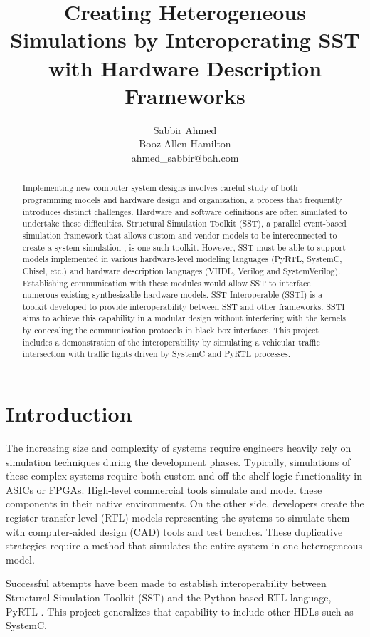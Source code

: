 \documentclass{article}
\title{Creating Heterogeneous Simulations by Interoperating SST with Hardware Description Frameworks}
\author{
  Sabbir Ahmed \\
  Booz Allen Hamilton \\
  ahmed\_sabbir@bah.com
}
\begin{document}
  \maketitle

  \begin{abstract}
    Implementing new computer system designs involves careful study of both programming models and
    hardware design and organization, a process that frequently introduces distinct challenges.
    Hardware and software definitions are often simulated to undertake these difficulties.
    Structural Simulation Toolkit (SST), a parallel event-based simulation framework that allows
    custom and vendor models to be interconnected to create a system simulation \cite{sst}, is one
    such toolkit. However, SST must be able to support models implemented in various hardware-level
    modeling languages (PyRTL, SystemC, Chisel, etc.) and hardware description languages (VHDL,
    Verilog and SystemVerilog). Establishing communication with these modules would allow SST to
    interface numerous existing synthesizable hardware models. SST Interoperable (SSTI) is a toolkit
    developed to provide interoperability between SST and other frameworks. SSTI aims to achieve
    this capability in a modular design without interfering with the kernels by concealing the
    communication protocols in black box interfaces. This project includes a demonstration of the
    interoperability by simulating a vehicular traffic intersection with traffic lights driven by
    SystemC and PyRTL processes.
  \end{abstract}

  \section{Introduction}  
  The increasing size and complexity of systems require engineers heavily rely on simulation
  techniques during the development phases. Typically, simulations of these complex systems require
  both custom and off-the-shelf logic functionality in ASICs or FPGAs. High-level commercial tools
  simulate and model these components in their native environments. On the other side, developers
  create the register transfer level (RTL) models representing the systems to simulate them with
  computer-aided design (CAD) tools and test benches. These duplicative strategies require a method
  that simulates the entire system in one heterogeneous model.

  Successful attempts have been made to establish interoperability between Structural Simulation
  Toolkit (SST) and the Python-based RTL language, PyRTL \cite{pyrtl-sst}. This project generalizes
  that capability to include other HDLs such as SystemC.
\end{document}
